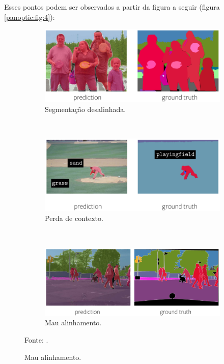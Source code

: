 Esses pontos podem ser observados a partir da figura a seguir (figura \ref{panoptic:fig:4}):

\begin{figure}[H]
   \caption{Falhas de segmentações panópticas.}
   \centering
   \label{panoptic:fig:4}
    \begin{subfigure}[t]{0.7\textwidth}
        \centering
        \includegraphics[width=1\linewidth]{recursos/imagens/panoptic/mau_adaptadas.png}
        \caption{Segmentação desalinhada.}
        \label{panoptic:fig:4.1}
    \end{subfigure}%
    ~ 

    \begin{subfigure}[t]{0.7\textwidth}
        \centering
        \includegraphics[width=1\linewidth]{recursos/imagens/panoptic/perda_contexto.png}
        \caption{Perda de contexto.}
        \label{panoptic:fig:4.2}
    \end{subfigure}%
    ~ 
    
    \begin{subfigure}[t]{0.7\textwidth}
        \centering
        \includegraphics[width=1\linewidth]{recursos/imagens/panoptic/mau_alinhamento.png}
        \caption{Mau alinhamento.}
        \label{panoptic:fig:4.3}
    \end{subfigure}

    \vspace*{1 cm}
    Fonte: \cite{Christoph2019VisualBeyond}.
\end{figure}